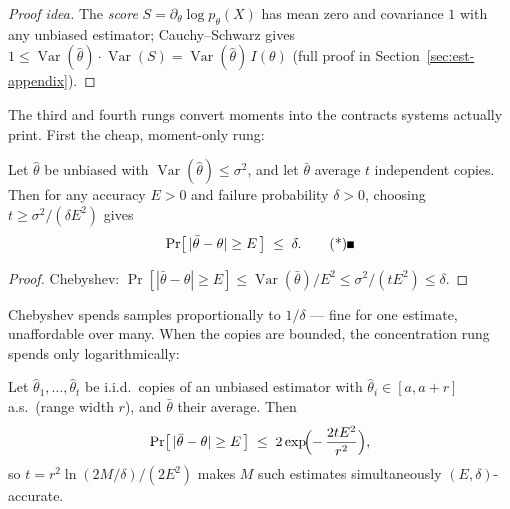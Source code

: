 \begin{proof}[Proof idea]
The \emph{score} $S = \partial_\theta\log p_\theta(X)$ has mean zero and covariance $1$ with
any unbiased estimator; Cauchy--Schwarz gives $1 \le \operatorname{Var}(\hat\theta)\cdot
\operatorname{Var}(S) = \operatorname{Var}(\hat\theta)\,I(\theta)$ (full proof in
Section~\ref{sec:est-appendix}).
\end{proof}


The third and fourth rungs convert moments into the contracts systems actually print. First the
cheap, moment-only rung:

\begin{proposition}\label{prop:est-chebyshev}
Let $\hat\theta$ be unbiased with $\operatorname{Var}(\hat\theta) \le \sigma^2$, and let $\bar\theta$
average $t$ independent copies. Then for any accuracy $E > 0$ and failure probability $\delta > 0$,
choosing $t \ge \sigma^2/(\delta E^2)$ gives
\[
\Pr\bigl[\,|\bar\theta - \theta| \ge E\,\bigr] \;\le\; \delta. \eopm
\]
\end{proposition}

\begin{proof}
Chebyshev: $\Pr[|\bar\theta-\theta| \ge E] \le \operatorname{Var}(\bar\theta)/E^2 \le
\sigma^2/(tE^2) \le \delta$.
\end{proof}

Chebyshev spends samples proportionally to $1/\delta$ --- fine for one estimate, unaffordable over
many. When the copies are bounded, the concentration rung spends only logarithmically:

\begin{proposition}\label{prop:est-hoeffding-inv}
Let $\hat\theta_1,\dots,\hat\theta_t$ be i.i.d.\ copies of an unbiased estimator with
$\hat\theta_i \in [a, a+r]$ a.s.\ (range width $r$), and $\bar\theta$ their average. Then
\[
\Pr\bigl[\,|\bar\theta - \theta| \ge E\,\bigr] \;\le\; 2\exp\!\Bigl(-\,\frac{2tE^2}{r^2}\Bigr),
\]
so $t = r^2\ln(2M/\delta)/(2E^2)$ makes $M$ such estimates simultaneously $(E,\delta)$-accurate.
\eop
\end{proposition}

